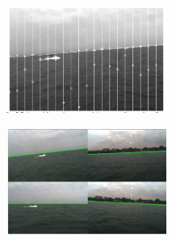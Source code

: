 \documentclass[12pt]{article}
\begin{document}
            \begin{figure}
                  \centering

                  \begin{subfigure}[b]{.40\linewidth}
                  \includegraphics[width=\linewidth, height= 3.5cm]{./Images/Wang/line-fitting}
                  \caption{}\label{fig:line-fitting}
                  \end{subfigure}
                  \begin{subfigure}[b]{.40\linewidth}
                  \includegraphics[width=\linewidth, height= 3.5cm]{./Images/Wang/horizon}
                  \caption{}\label{fig:horizon}
                  \end{subfigure}


\end{figure}
\end{document}
